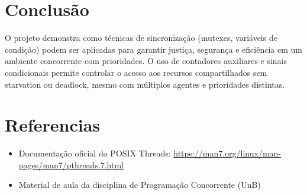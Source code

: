 \documentclass[10pt,a4paper]{article}
\begin{document}
\section{Conclusão}

O projeto demonstra como técnicas de sincronização (mutexes, variáveis de condição) podem ser aplicadas para garantir justiça, segurança e eficiência em um ambiente concorrente com prioridades. O uso de contadores auxiliares e sinais condicionais permite controlar o acesso aos recursos compartilhados sem starvation ou deadlock, mesmo com múltiplos agentes e prioridades distintas.

\section{Referencias}

\begin{itemize}
    \item Documentação oficial do POSIX Threads: \url{https://man7.org/linux/man-pages/man7/pthreads.7.html}
    \item Material de aula da disciplina de Programação Concorrente (UnB)
\end{itemize}
\end{document}
